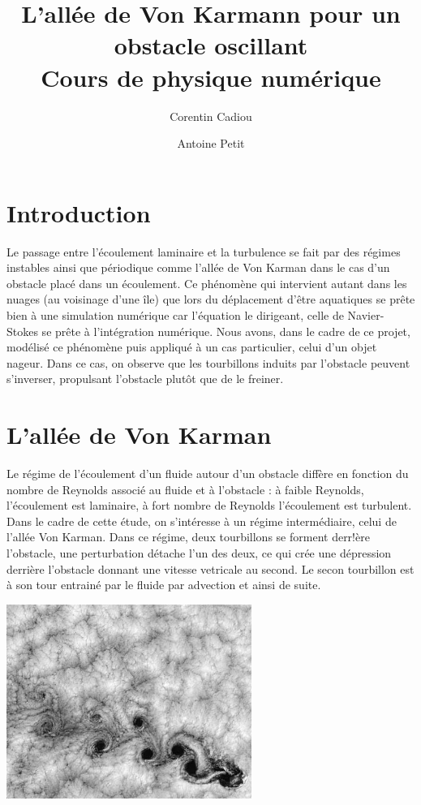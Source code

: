 
\title{L'allée de Von Karmann pour un obstacle oscillant\\
Cours de physique numérique}

\author{Corentin Cadiou \and Antoine Petit}
\date{}



\maketitle

\tableofcontents

\section*{Introduction}

	Le passage entre l'écoulement laminaire et la turbulence se fait par des régimes instables ainsi que périodique comme l'allée de Von Karman dans le cas d'un obstacle placé dans un écoulement.
	Ce phénomène qui intervient autant dans les nuages (au voisinage d'une île) que lors du déplacement d'être aquatiques se prête bien à une simulation numérique car l'équation le dirigeant, celle de Navier-Stokes se prête à l'intégration numérique.
	Nous avons, dans le cadre de ce projet, modélisé ce phénomène puis appliqué à un cas particulier, celui d'un objet nageur. Dans ce cas, on observe que les tourbillons induits par l'obstacle peuvent s'inverser, propulsant l'obstacle plutôt que de le freiner.

\section{L'allée de Von Karman}
	
	Le régime de l'écoulement d'un fluide autour d'un obstacle diffère en fonction du nombre de Reynolds associé au fluide et à l'obstacle : à faible Reynolds, l'écoulement est laminaire, à fort nombre de Reynolds l'écoulement est turbulent. Dans le cadre de cette étude, on s'intéresse à un régime intermédiaire, celui de l'allée Von Karman. Dans ce régime, deux tourbillons se forment derr!ère l'obstacle, une perturbation détache l'un des deux, ce qui crée une dépression derrière l'obstacle donnant une vitesse vetricale au second. Le secon tourbillon est à son tour entrainé par le fluide par advection et ainsi de suite.
	
\begin{center}
  \includegraphics[width=0.6\textwidth]{von-karman-clouds.jpg}
\end{center}
  
